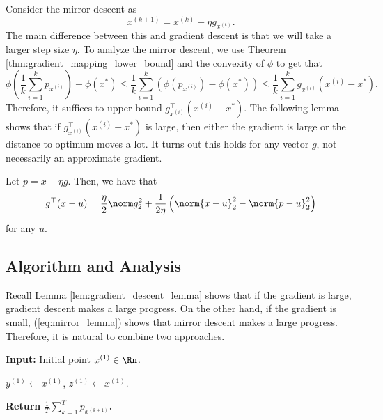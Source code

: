 Consider the mirror descent as
\begin{equation}
x^{(k+1)}=x^{(k)}-\eta g_{x^{(k)}}.\label{eq:mirror_step}
\end{equation}
The main difference between this and gradient descent is that we will
take a larger step size $\eta$. To analyze the mirror descent, we
use Theorem \ref{thm:gradient_mapping_lower_bound} and the convexity
of $\phi$ to get that
\begin{equation}
\phi(\frac{1}{k}\sum_{i=1}^{k}p_{x^{(i)}})-\phi(x^{*})\leq\frac{1}{k}\sum_{i=1}^{k}(\phi(p_{x^{(i)}})-\phi(x^{*}))\leq\frac{1}{k}\sum_{i=1}^{k}g_{x^{(i)}}^{\top}(x^{(i)}-x^{*}).\label{eq:mirror_lemma}
\end{equation}
Therefore, it suffices to upper bound $g_{x^{(i)}}^{\top}(x^{(i)}-x^{*})$.
The following lemma shows that if $g_{x^{(i)}}^{\top}(x^{(i)}-x^{*})$
is large, then either the gradient is large or the distance to optimum
moves a lot. It turns out this holds for any vector $g$, not necessarily
an approximate gradient.
\begin{lem}
\label{lem:mirror_step}Let $p=x-\eta g$. Then, we have that
\[
g^{\top}(x-u)=\frac{\eta}{2}\norm g_{2}^{2}+\frac{1}{2\eta}\left(\norm{x-u}_{2}^{2}-\norm{p-u}_{2}^{2}\right)
\]
for any $u$.
\end{lem}


\subsection{Algorithm and Analysis}

Recall Lemma \ref{lem:gradient_descent_lemma} shows that if the gradient
is large, gradient descent makes a large progress. On the other hand,
if the gradient is small, (\ref{eq:mirror_lemma}) shows that mirror
descent makes a large progress. Therefore, it is natural to combine
two approaches.

\begin{algorithm2e}[H]

\caption{$\mathtt{AGD}$}

\SetAlgoLined

\textbf{Input:} Initial point $x^{(1)}\in\Rn$.

$y^{(1)}\leftarrow x^{(1)}$, $z^{(1)}\leftarrow x^{(1)}$.


\textbf{Return $\frac{1}{T}\sum_{k=1}^{T}p_{x^{(k+1)}}$.}

\end{algorithm2e}

